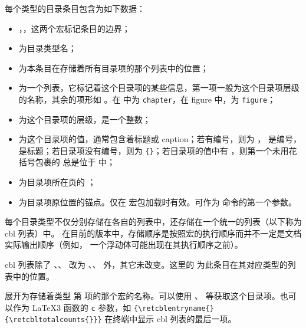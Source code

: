 \documentclass{cusdoc}
\begin{document}
每个类型的目录条目包含为如下数据：

{\centering {}\par}

\begin{itemize}[nosep]
  \item {}，，这两个宏标记条目的边界；
  \item {} 为目录类型名；
  \item {} 为本条目在存储着所有目录项的那个列表中的位置；
  \item {} 为一个列表，它标记着这个目录项的某些信息，第一项一般为这个目录项层级的名称，其余的项形如 。在  中为 \texttt{chapter}，在 figure 中，为 \texttt{figure}；
  \item {} 为这个目录项的层级，是一个整数；
  \item {} 为这个目录项的值，通常包含着标题或 caption；若有编号，则为 ， 是编号， 是标题；若目录项没有编号，则为 \texttt{\{\}}；若目录项的值中有 ，则第一个未用花括号包裹的  总是位于  中；
  \item {} 为目录项所在页的 ；
  \item {} 为目录项原位置的锚点。仅在  宏包加载时有效。可作为  命令的第一个参数。
\end{itemize}

每个目录类型不仅分别存储在各自的列表中，还存储在一个统一的列表（以下称为 cbl 列表）中。
在目前的版本中，存储顺序是按照宏的执行顺序而并不一定是文档实际输出顺序（例如，
一个浮动体可能出现在其执行顺序之前）。

cbl 列表除了 、、
 改为 、、
 外，其它未改变。这里的  为此条目在其对应类型的列表中的位置。

\begin{function}[EXP]{\retcblentryname}
  \begin{syntax}
    \V\retcblentryname {} 
  \end{syntax}
展开为存储着类型  第  项的那个宏的名称。可以使用 、\linebreak
{} 等获取这个目录项。也可以作为 \LaTeX3 函数的 \texttt{c} 参数，如  \verb|{\retcblentryname{}{\retcbltotalcounts{}}}| 在终端中显示 cbl 列表的最后一项。
\end{function}
\end{document}
